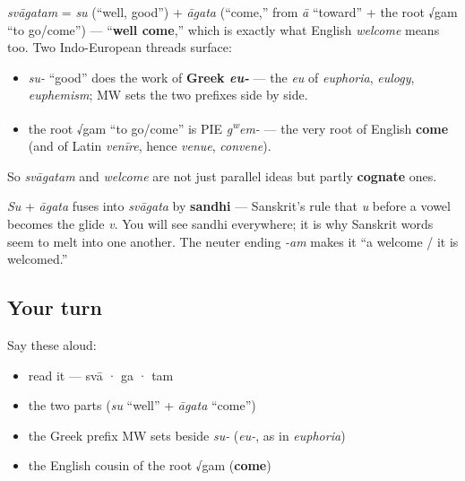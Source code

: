 \begin{cousinweb}
\emph{svāgatam} = \emph{su} (\textquotedblleft{}well, good\textquotedblright{}) + \emph{āgata} (\textquotedblleft{}come,\textquotedblright{} from \emph{ā} \textquotedblleft{}toward\textquotedblright{} + the root √gam \textquotedblleft{}to go/come\textquotedblright{}) — \textquotedblleft{}\textbf{well come},\textquotedblright{} which is exactly what English \emph{welcome} means too. Two Indo-European threads surface:

\begin{itemize}
\raggedright
  \item \emph{su-} \textquotedblleft{}good\textquotedblright{} does the work of \textbf{Greek \emph{eu-}} — the \emph{eu} of \emph{euphoria}, \emph{eulogy}, \emph{euphemism}; MW sets the two prefixes side by side.
  \item the root √gam \textquotedblleft{}to go/come\textquotedblright{} is PIE \emph{g\textsuperscript{w}em-} — the very root of English \textbf{come} (and of Latin \emph{venīre}, hence \emph{venue}, \emph{convene}).
\end{itemize}

So \emph{svāgatam} and \emph{welcome} are not just parallel ideas but partly \textbf{cognate} ones.
\end{cousinweb}

\begin{culture}
\emph{Su} + \emph{āgata} fuses into \emph{svāgata} by \textbf{sandhi} — Sanskrit's rule that \emph{u} before a vowel becomes the glide \emph{v}. You will see sandhi everywhere; it is why Sanskrit words seem to melt into one another. The neuter ending \emph{-am} makes it \textquotedblleft{}a welcome / it is welcomed.\textquotedblright{}
\end{culture}

\subsection*{Your turn}
Say these aloud:

\begin{itemize}
\raggedright
  \item read it — svā · ga · tam
  \item the two parts (\emph{su} \textquotedblleft{}well\textquotedblright{} + \emph{āgata} \textquotedblleft{}come\textquotedblright{})
  \item the Greek prefix MW sets beside \emph{su-} (\emph{eu-}, as in \emph{euphoria})
  \item the English cousin of the root √gam (\textbf{come})
\end{itemize}

